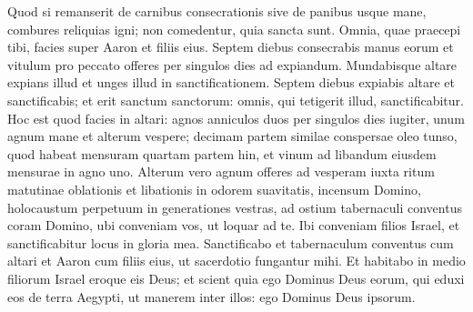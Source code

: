 \begin{biblechapter}
\begin{biblechapter}
\begin{biblechapter}
\begin{biblechapter}
\begin{biblechapter}
\begin{biblechapter}
\begin{biblechapter}
\begin{biblechapter}
\begin{biblechapter}
\begin{biblechapter}
\begin{biblechapter}
\begin{biblechapter}
\begin{biblechapter}
\begin{biblechapter}
\begin{biblechapter}
\begin{biblechapter}
\begin{biblechapter}
\begin{biblechapter}
\begin{biblechapter}
\begin{biblechapter}
\begin{biblechapter}
\begin{biblechapter}
\begin{biblechapter}
\begin{biblechapter}
\begin{biblechapter}
\begin{biblechapter}
\begin{biblechapter}
\begin{biblechapter}
\begin{biblechapter}
\verse Quod si remanserit de carnibus consecrationis sive de panibus usque mane, combures reliquias igni; non comedentur, quia sancta sunt.
 \verse Omnia, quae praecepi tibi, facies super Aaron et filiis eius. Septem diebus consecrabis manus eorum 
\verse et vitulum pro peccato offeres per singulos dies ad expiandum. Mundabisque altare expians illud et unges illud in sanctificationem. 
\verse Septem diebus expiabis altare et sanctificabis; et erit sanctum sanctorum: omnis, qui tetigerit illud, sanctificabitur.
 \verse Hoc est quod facies in altari: agnos anniculos duos per singulos dies iugiter, 
\verse unum agnum mane et alterum vespere; 
\verse decimam partem similae conspersae oleo tunso, quod habeat mensuram quartam partem hin, et vinum ad libandum eiusdem mensurae in agno uno. 
\verse Alterum vero agnum offeres ad vesperam iuxta ritum matutinae oblationis et libationis in odorem suavitatis, incensum Domino, 
\verse holocaustum perpetuum in generationes vestras, ad ostium tabernaculi conventus coram Domino, ubi conveniam vos, ut loquar ad te.
 \verse Ibi conveniam filios Israel, et sanctificabitur locus in gloria mea. 
\verse Sanctificabo et tabernaculum conventus cum altari et Aaron cum filiis eius, ut sacerdotio fungantur mihi. 
\verse Et habitabo in medio filiorum Israel eroque eis Deus; 
\verse et scient quia ego Dominus Deus eorum, qui eduxi eos de terra Aegypti, ut manerem inter illos: ego Dominus Deus ipsorum.
 

\end{biblechapter}
\end{biblechapter}
\end{biblechapter}
\end{biblechapter}
\end{biblechapter}
\end{biblechapter}
\end{biblechapter}
\end{biblechapter}
\end{biblechapter}
\end{biblechapter}
\end{biblechapter}
\end{biblechapter}
\end{biblechapter}
\end{biblechapter}
\end{biblechapter}
\end{biblechapter}
\end{biblechapter}
\end{biblechapter}
\end{biblechapter}
\end{biblechapter}
\end{biblechapter}
\end{biblechapter}
\end{biblechapter}
\end{biblechapter}
\end{biblechapter}
\end{biblechapter}
\end{biblechapter}
\end{biblechapter}
\end{biblechapter}
